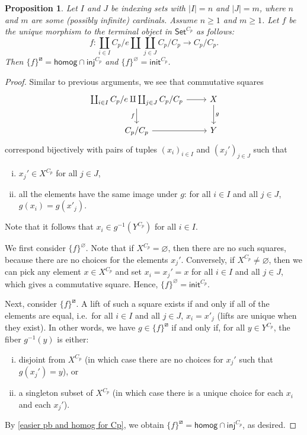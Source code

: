 \documentclass{amsart}
\renewcommand\emptyset\varnothing
\newcommand{\Set}{\mathsf{Set}}
\newcommand{\CpSet}{\Set^{C_p}}
\newcommand{\rlp}[1]{{#1}^{\boxslash}}
\newcommand{\inj}{\mathsf{inj}}
\newcommand{\init}{\mathsf{init}}
\newcommand{\homog}{\mathsf{homog}}
\numberwithin{equation}{section}
\newtheorem{proposition}[equation]{Proposition}
\theoremstyle{definition}
\begin{document}
\begin{proposition}
	\label{n >= 1 m >= 1 in table 3}
	Let $I$ and $J$ be indexing sets with $|I| = n$ and $|J|=m$, where $n$ and $m$ are some (possibly infinite) cardinals. Assume $n \geq 1$ and $m \geq 1$. Let $f$ be the unique morphism to the terminal object in $\CpSet$ as follows:
	\[
		f \colon \coprod_{i \in I} C_p/e \amalg \coprod_{j \in J} C_p/C_p  \to C_p/C_p.
	\]
	Then $\rlp{\{f\}} = \homog \cap \inj^{C_p}$ and $\{f\}^\emptyset = \init^{C_p}$.
\end{proposition}

\begin{proof}
	Similar to previous arguments, we see that commutative squares
	\[
		\begin{tikzcd}
			\coprod_{i \in I} C_p/e \amalg \coprod_{j \in J} C_p/C_p  \ar[d, "f"']
			\ar[r] & X \ar[d, "g"] \\
			C_p/C_p \ar[r] & Y
		\end{tikzcd}
	\]
	correspond bijectively with pairs of tuples $(x_i)_{i \in I}$ and $(x_j')_{j \in J}$ such that
		\begin{enumerate}[(i)]
			\item $x_j' \in X^{C_p}$ for all $j \in J$,
			\item all the elements have the same image under $g$: for all $i \in I$ and all $j \in J$, $g(x_i) = g(x'_j)$.
		\end{enumerate}
		Note that it follows that $x_i \in g^{-1}(Y^{C_p})$ for all $i \in I$.

	We first consider $\{f\}^\emptyset$. Note that if $X^{C_p} = \emptyset$, then there are no such squares, because there are no choices for the elements $x_j'$. Conversely, if $X^{C_p} \neq \emptyset$, then we can pick any element $x \in X^{C_p}$ and set $x_i = x_j' = x$ for all $i \in I$ and all $j \in J$, which gives a commutative square. Hence, $\{f\}^\emptyset = \init^{C_p}$.

		Next, consider $\rlp{\{f\}}$. A lift of such a square exists if and only if all of the elements are equal, i.e.\ for all $i \in I$ and all $j \in J$, $x_i = x'_j$ (lifts are unique when they exist). In other words, we have $g \in \rlp{\{f\}}$ if and only if, for all $y \in Y^{C_p}$, the fiber $g^{-1}(y)$ is either:
		\begin{enumerate}[(i)]
			\item disjoint from $X^{C_p}$ (in which case there are no choices for $x_j'$ such that $g(x_j') = y$), or
			\item a singleton subset of $X^{C_p}$ (in which case there is a unique choice for each $x_i$ and each $x_j'$).
		\end{enumerate}
		By \cref{easier pb and homog for Cp}, we obtain $\rlp{\{f\}} = \homog \cap \inj^{C_p}$, as desired.
\end{proof}
\end{document}

